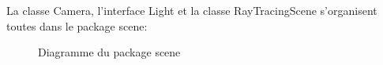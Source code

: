 \documentclass[../../Raaport RayTracer]{subfiles}
\begin{document}
La classe Camera, l'interface Light et la classe RayTracingScene s'organisent toutes dans le package scene:

\begin{figure}[h!]
	
	\caption{Diagramme du package scene}
	\label{diagrammePackageScene}
\end{figure}
\FloatBarrier
\end{document}
